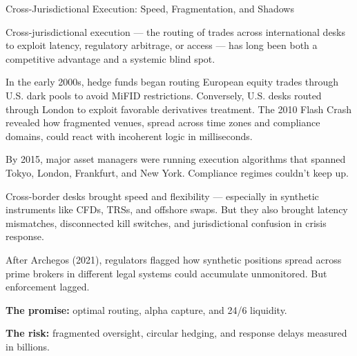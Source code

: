 \medskip

\begin{HistoricalSidebar}{Cross-Jurisdictional Execution: Speed, Fragmentation, and Shadows}

  Cross-jurisdictional execution — the routing of trades across international desks to exploit 
  latency, regulatory 
  arbitrage, or access — has long been both a competitive advantage and a systemic blind spot.

  \medskip
  
  In the early 2000s, hedge funds began routing European equity trades through U.S. dark pools 
  to avoid MiFID 
  restrictions. Conversely, U.S. desks routed through London to exploit favorable derivatives 
  treatment. The 2010 
  Flash Crash revealed how fragmented venues, spread across time zones and compliance domains, 
  could react with 
  incoherent logic in milliseconds.

  \medskip
  
  By 2015, major asset managers were running execution algorithms that spanned Tokyo, London, 
  Frankfurt, and New 
  York. Compliance regimes couldn’t keep up.

  \medskip
  
  Cross-border desks brought speed and flexibility — especially in synthetic instruments like 
  CFDs, TRSs, and 
  offshore swaps. But they also brought latency mismatches, disconnected kill switches, and 
  jurisdictional confusion 
  in crisis response.

  \medskip
  
  After Archegos (2021), regulators flagged how synthetic positions spread across prime brokers in 
  different legal 
  systems could accumulate unmonitored. But enforcement lagged.

  \medskip
  
  \textbf{The promise:} optimal routing, alpha capture, and 24/6 liquidity.

  \medskip

  \textbf{The risk:} fragmented oversight, circular hedging, and response delays measured in billions.
  
\end{HistoricalSidebar}

\medskip



